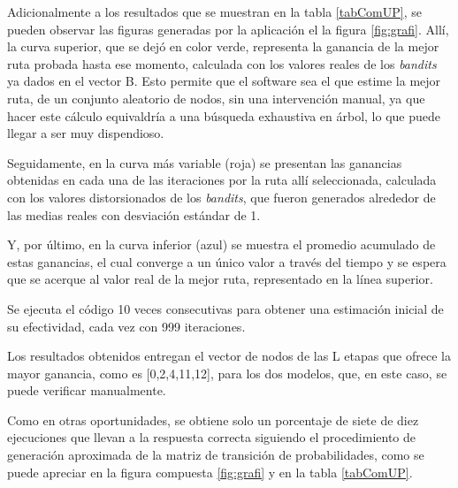 Adicionalmente a los resultados que se muestran en la tabla \ref{tabComUP}, se pueden observar las figuras generadas por la aplicación el la figura \ref{fig:grafi}. Allí, la curva superior, que se dejó en color verde, representa la ganancia de la mejor ruta probada hasta ese momento, calculada con los valores reales de los \textit{bandits} ya dados en el vector B. Esto permite que el software sea el que estime la mejor ruta, de un conjunto aleatorio de nodos, sin una intervención manual, ya que hacer este cálculo equivaldría a una búsqueda exhaustiva en árbol, lo que puede llegar a ser muy dispendioso.

Seguidamente, en la curva más variable (roja) se presentan las ganancias obtenidas en cada una de las iteraciones por la ruta allí seleccionada, calculada con los valores distorsionados de los \textit{bandits}, que fueron generados alrededor de las medias reales con desviación estándar de 1. 

Y, por último, en la curva inferior (azul) se muestra el promedio acumulado de estas ganancias, el cual converge a un único valor a través del tiempo y se espera que se acerque al valor real de la mejor ruta, representado en la línea superior.

Se ejecuta el código 10 veces consecutivas para obtener una estimación inicial de su efectividad, cada vez con 999 iteraciones.

Los resultados obtenidos entregan el vector de nodos de las L etapas que ofrece la mayor ganancia, como es [0,2,4,11,12], para los dos modelos, que, en este caso, se puede verificar manualmente.

Como en otras oportunidades, se obtiene solo un porcentaje de siete de diez ejecuciones que llevan a la respuesta correcta siguiendo el procedimiento de generación aproximada de la matriz de transición de probabilidades, como se puede apreciar en la figura compuesta \ref{fig:grafi} y en la tabla \ref{tabComUP}. %

